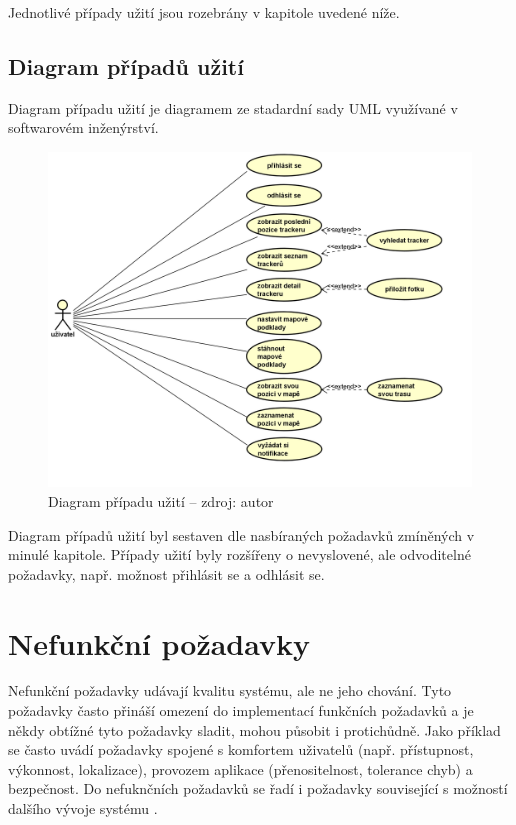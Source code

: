 Jednotlivé případy užití jsou rozebrány v kapitole uvedené níže.

\subsection{Diagram případů užití}

Diagram případu užití je diagramem ze stadardní sady UML využívané v softwarovém inženýrství.

\begin{figure}[H]
	\begin{center}
		\includegraphics[width=140mm]{img/usecase.png}
	\end{center}
	\caption[Diagram případu užití]{Diagram případu užití -- zdroj: autor}
\end{figure}

Diagram případů užití byl sestaven dle nasbíraných požadavků zmíněných v minulé kapitole. Případy užití byly rozšířeny o nevyslovené, ale odvoditelné požadavky, např. možnost přihlásit se a odhlásit se.

\section{Nefunkční požadavky}

Nefunkční požadavky udávají kvalitu systému, ale ne jeho chování. Tyto požadavky často přináší omezení do implementací funkčních požadavků a je někdy obtížné tyto požadavky sladit, mohou působit i protichůdně. Jako příklad se často uvádí požadavky spojené s komfortem uživatelů (např. přístupnost, výkonnost, lokalizace), provozem aplikace (přenositelnost, tolerance chyb) a bezpečnost. Do nefuknčních požadavků se řadí i požadavky související s možností dalšího vývoje systému \cite{chung2012non}.

